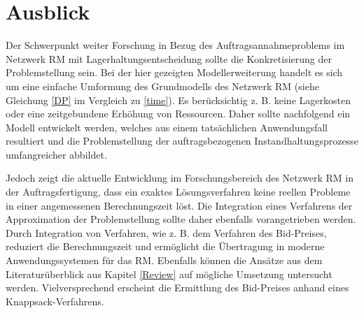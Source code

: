 \section*{Ausblick}

Der Schwerpunkt weiter Forschung in Bezug des Auftragsannahmeproblems im Netzwerk RM mit Lagerhaltungsentscheidung sollte die Konkretisierung der Problemstellung sein. Bei der hier gezeigten Modellerweiterung handelt es sich um eine einfache Umformung des Grundmodells des Netzwerk RM (siehe Gleichung \eqref{DP} im Vergleich zu \eqref{time}). Es berücksichtig z. B. keine Lagerkosten oder eine zeitgebundene Erhöhung von Ressourcen. Daher sollte nachfolgend ein Modell entwickelt werden, welches aus einem tatsächlichen Anwendungsfall resultiert und die Problemstellung der auftragsbezogenen Instandhaltungsprozesse umfangreicher abbildet.

Jedoch zeigt die aktuelle Entwicklung im Forschungsbereich des Netzwerk RM in der Auftragsfertigung, dass ein exaktes Lösungsverfahren keine reellen Probleme in einer angemessenen Berechnungszeit löst. Die Integration eines Verfahrens der Approximation der Problemstellung sollte daher ebenfalls vorangetrieben werden. Durch Integration von Verfahren, wie z. B. dem Verfahren des Bid-Preises, reduziert die Berechnungszeit und ermöglicht die Übertragung in moderne Anwendungssystemen für das RM. Ebenfalls können die Ansätze aus dem Literaturüberblick aus Kapitel \ref{Review} auf mögliche Umsetzung untersucht werden. Vielversprechend erscheint die Ermittlung des Bid-Preises anhand eines Knappsack-Verfahrens.




